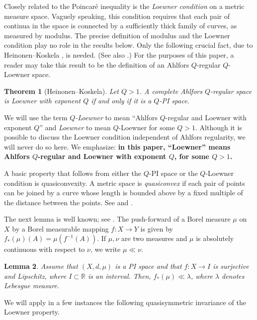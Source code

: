 \documentclass{amsart}
\theoremstyle{plain}
\newtheorem{theorem}{Theorem}
\newtheorem{lemma}[theorem]{Lemma}
\theoremstyle{definition}
\numberwithin{equation}{section}
\numberwithin{theorem}{section}
\newcommand{\RR}{\mathbb{R}}
\begin{document}
Closely related to the Poincar\'e inequality is the \emph{Loewner condition} on a metric measure space. Vaguely speaking, this condition requires that each pair of continua in the space is connected by a sufficiently thick family of curves, as measured by modulus. The precise definition of modulus and the Loewner condition play no role in the results below. Only the following crucial fact, due to Heinonen--Koskela \cite{HK}, is needed. (See also \cite[Ch. 9]{He}.) For the purposes of this paper, a reader may take this result to be the definition of an Ahlfors $Q$-regular $Q$-Loewner space.

\begin{theorem}[Heinonen--Koskela]\label{thm:LoewnerPI} Let $Q>1$.
A complete Ahlfors $Q$-regular space is Loewner with exponent $Q$ if and only if it is a $Q$-PI space.
\end{theorem}
We will use the term \emph{$Q$-Loewner} to mean ``Ahlfors $Q$-regular and Loewner with exponent $Q$'' and \emph{Loewner} to mean $Q$-Loewner for some $Q>1$. Although it is possible to discuss the Loewner condition independent of Ahlfors regularity, we will never do so here. We emphasize: \textbf{in this paper, ``Loewner'' means Ahlfors $Q$-regular and Loewner with exponent $Q$, for some $Q>1$.}

A basic property that follows from either the $Q$-PI space or the $Q$-Loewner condition is quasiconvexity. A metric space is \emph{quasiconvex} if each pair of points can be joined by a curve whose length is bounded above by a fixed multiple of the distance between the points. See \cite[Ch. 8]{He} and \cite[Ch. 8]{HKST}.



 The next lemma is well known; see \cite[Lemma 4.3]{Bourdon2002}.   The push-forward of a Borel measure $\mu$ on $X$ by a Borel measurable mapping $f:X\to Y$ is given by $f_*(\mu)(A)=\mu(f^{-1}(A))$. If $\mu,\nu$ are two measures and $\mu$ is absolutely continuous with respect to $\nu$, we write $\mu \ll \nu$.

\begin{lemma}\label{lem:notPI}
Assume that $(X,d,\mu)$ is a PI space and that $f:X\to I$ is surjective and Lipschitz, where $I\subset \RR$ is an interval. Then,  $f_*(\mu) \ll \lambda$, where $\lambda$ denotes Lebesgue measure.
\end{lemma}

We will apply in a few instances the following quasisymmetric invariance of the Loewner property.
\end{document}
